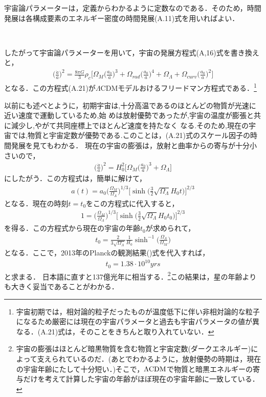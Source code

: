 宇宙論パラメーターは，定義からわかるように定数なのである．そのため，時間発展は各構成要素のエネルギー密度の時間発展(A.11)式を用いればよい．
\begin{empheqboxed}
\

したがって宇宙論パラメーターを用いて，宇宙の発展方程式(A,16)式を書き換えと，
\begin{eqnarray}
\label{cdm}
\biggl(\frac{\dot{a}}{a}\biggr)^2=\frac{8\pi G}{3}\rho_{c}\biggl[\Omega_{M}\biggl(\frac{a_0}{a}\biggr)^3+\Omega_{rad}\biggl(\frac{a_0}{a}\biggr)^4+\Omega_{\Lambda}+\Omega_{curv}\biggl(\frac{a_0}{a}\biggr)^2\biggr]
\end{eqnarray}
となる．この方程式(A.21)が$\Lambda$CDMモデルおけるフリードマン方程式である．\footnote{宇宙初期では，相対論的粒子だったものが温度低下に伴い非相対論的な粒子になるため厳密には現在の宇宙パラメータと過去も宇宙パラメータの値が異なる．(A.21)式は，そのことをきちんと取り入れていない．}
\end{empheqboxed}
以前にも述べとように，初期宇宙は,十分高温であるのほとんどの物質が光速に近い速度で運動しているため,始
めは放射優勢であったが,宇宙の温度が膨張と共に減少し,やがて共同座標上でほとんど速度を持たなく
なる.そのため,現在の宇宙では,物質と宇宙定数が優勢である.このことは，(A.21)式のスケール因子の時間発展を見てもわかる．
現在の宇宙の膨張は，放射と曲率からの寄与が十分小さいので，
\begin{eqnarray}
\biggl(\frac{\dot{a}}{a}\biggr)^2=H^2_{0}\biggl[\Omega_{M}\biggl(\frac{a_0}{a}\biggr)^3+\Omega_{\Lambda}\biggr]
\end{eqnarray}
にしたがう．この方程式は，簡単に解けて，
\begin{eqnarray}
a(t)=a_0\biggl(\frac{\Omega_{M}}{\Omega_{\Lambda}}\biggr)^{1/3}\biggl[\sinh\biggl(\frac{3}{2}\sqrt{\Omega_{\Lambda}}H_0 t\biggr)\biggr]^{2/3}
\end{eqnarray}
となる．現在の時刻$t=t_0$をこの方程式に代入すると，
\begin{eqnarray}
1=\biggl(\frac{\Omega_{M}}{\Omega_{\Lambda}}\biggr)^{1/3}\biggl[\sinh\biggl(\frac{3}{2}\sqrt{\Omega_{\Lambda}}H_0 t_0\biggr)\biggr]^{2/3}
\end{eqnarray}
を得る．この方程式から現在の宇宙の年齢$t_0$が求められて，
\begin{eqnarray}
t_0=\frac{2}{3\sqrt{\Omega_{\Lambda}}}\frac{1}{H_0}\sinh^{-1}\biggl(\frac{\Omega_{\Lambda}}{\Omega_{M}}\biggr)
\end{eqnarray}
となる．ここで，2013年のPlanckの観測結果()式を代入すれば，
\begin{eqnarray}
t_0=1.38\cdot 10^{10} yrs
\end{eqnarray}と求まる．
日本語に直すと137億光年に相当する．\footnote{宇宙の膨張はほとんど暗黒物質を含む物質と宇宙定数(ダークエネルギー)によって支えられているのだ．(あとでわかるように，放射優勢の時期は，現在の宇宙年齢にたして十分短い．)そこで，$\rm{\Lambda CDM}$で物質と暗黒エネルギーの寄与だけを考えて計算した宇宙の年齢がほぼ現在の宇宙年齢に一致している．}この結果は，星の年齢よりも大きく妥当であることがわかる．


